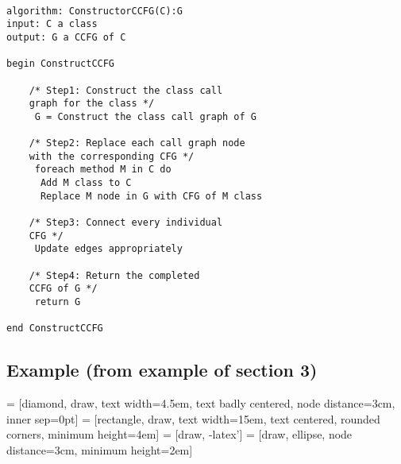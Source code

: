 \documentclass[letterpaper,twocolumn,10pt]{article}
\begin{document}
\paragraph{}
\lstset{basicstyle=\small\ttfamily, tabsize=2}
\begin{lstlisting}
algorithm: ConstructorCCFG(C):G
input: C a class
output: G a CCFG of C

begin ConstructCCFG
	
	/* Step1: Construct the class call 
	graph for the class */ 
	 G = Construct the class call graph of G
	  
	/* Step2: Replace each call graph node 
	with the corresponding CFG */
	 foreach method M in C do
	  Add M class to C	  
	  Replace M node in G with CFG of M class

	/* Step3: Connect every individual 
	CFG */
	 Update edges appropriately 

	/* Step4: Return the completed 
	CCFG of G */
	 return G

end ConstructCCFG
\end{lstlisting}

\subsection{Example (from example of section 3)}

 = [diamond, draw, 
    text width=4.5em, text badly centered, node distance=3cm, inner sep=0pt]
 = [rectangle, draw, 
    text width=15em, text centered, rounded corners, minimum height=4em]
 = [draw, -latex']
 = [draw, ellipse, node distance=3cm,
    minimum height=2em]
\begin{center}
\end{center}

{\footnotesize 

}



\theendnotes


\end{document}
